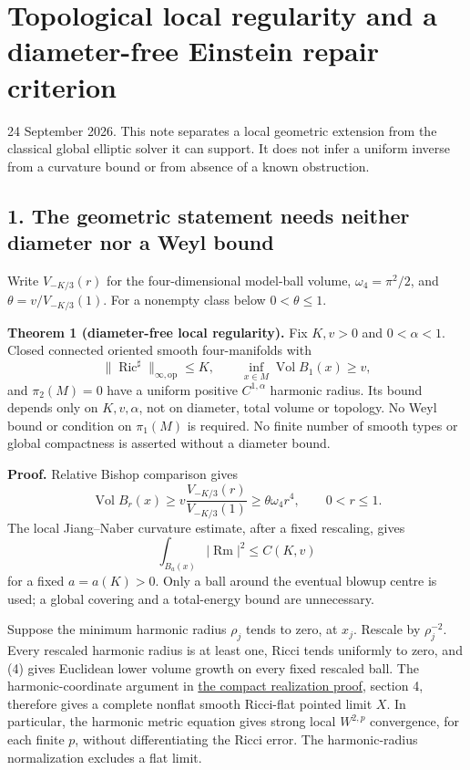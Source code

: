\documentclass[
  11pt,
]{article}
\author{}
\date{}
\begin{document}
\hypertarget{topological-local-regularity-and-a-diameter-free-einstein-repair-criterion}{%
\section{Topological local regularity and a diameter-free Einstein
repair
criterion}\label{topological-local-regularity-and-a-diameter-free-einstein-repair-criterion}}

24 September 2026. This note separates a local geometric extension from
the classical global elliptic solver it can support. It does not infer a
uniform inverse from a curvature bound or from absence of a known
obstruction.

\hypertarget{the-geometric-statement-needs-neither-diameter-nor-a-weyl-bound}{%
\subsection{1. The geometric statement needs neither diameter nor a Weyl
bound}\label{the-geometric-statement-needs-neither-diameter-nor-a-weyl-bound}}

Write \(V_{-K/3}(r)\) for the four-dimensional model-ball volume,
\(\omega_4=\pi^2/2\), and \(\theta=v/V_{-K/3}(1)\). For a nonempty class
below \(0<\theta\le1\).

\textbf{Theorem 1 (diameter-free local regularity).} Fix \(K,v>0\) and
\(0<\alpha<1\). Closed connected oriented smooth four-manifolds with \[
 \|\operatorname{Ric}^{\sharp}\|_{\infty,\mathrm{op}}\le K,
 \qquad \inf_{x\in M}\operatorname{Vol}B_1(x)\ge v,                \tag{2}
\] and \(\pi_2(M)=0\) have a uniform positive \(C^{1,\alpha}\) harmonic
radius. Its bound depends only on \(K,v,\alpha\), not on diameter, total
volume or topology. No Weyl bound or condition on \(\pi_1(M)\) is
required. No finite number of smooth types or global compactness is
asserted without a diameter bound.

\textbf{Proof.} Relative Bishop comparison gives \[
 \operatorname{Vol}B_r(x)\ge
 v\frac{V_{-K/3}(r)}{V_{-K/3}(1)}\ge\theta\omega_4r^4,
 \qquad 0<r\le1.                                             \tag{4}
\] The local Jiang--Naber curvature estimate, after a fixed rescaling,
gives \[
 \int_{B_a(x)}|\operatorname{Rm}|^2\le C(K,v)                  \tag{5}
\] for a fixed \(a=a(K)>0\). Only a ball around the eventual blowup
centre is used; a global covering and a total-energy bound are
unnecessary.

Suppose the minimum harmonic radius \(\rho_j\) tends to zero, at
\(x_j\). Rescale by \(\rho_j^{-2}\). Every rescaled harmonic radius is
at least one, Ricci tends uniformly to zero, and (4) gives Euclidean
lower volume growth on every fixed rescaled ball. The
harmonic-coordinate argument in
\href{20260923_compact_realization.md}{the compact realization proof},
section 4, therefore gives a complete nonflat smooth Ricci-flat pointed
limit \(X\). In particular, the harmonic metric equation gives strong
local \(W^{2,p}\) convergence, for each finite \(p\), without
differentiating the Ricci error. The harmonic-radius normalization
excludes a flat limit.
\end{document}
